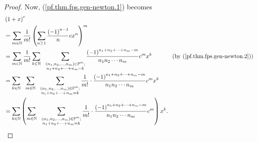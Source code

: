 \begin{proof}
Now, (\ref{pf.thm.fps.gen-newton.1}) becomes%
\begin{align}
&  \left(  1+x\right)  ^{c}\nonumber\\
&  =\sum_{m\in\mathbb{N}}\dfrac{1}{m!}\left(  \sum_{n\geq1}\dfrac{\left(
-1\right)  ^{n-1}}{n}cx^{n}\right)  ^{m}\nonumber\\
&  =\sum_{m\in\mathbb{N}}\dfrac{1}{m!}\sum_{k\in\mathbb{N}}\ \ \sum
_{\substack{\left(  n_{1},n_{2},\ldots,n_{m}\right)  \in\mathbb{P}^{m}%
;\\n_{1}+n_{2}+\cdots+n_{m}=k}}\dfrac{\left(  -1\right)  ^{n_{1}+n_{2}%
+\cdots+n_{m}-m}}{n_{1}n_{2}\cdots n_{m}}c^{m}x^{k}\ \ \ \ \ \ \ \ \ \ \left(
\text{by (\ref{pf.thm.fps.gen-newton.2})}\right) \nonumber\\
&  =\sum_{k\in\mathbb{N}}\ \ \sum_{m\in\mathbb{N}}\ \ \sum_{\substack{\left(
n_{1},n_{2},\ldots,n_{m}\right)  \in\mathbb{P}^{m};\\n_{1}+n_{2}+\cdots
+n_{m}=k}}\dfrac{1}{m!}\cdot\dfrac{\left(  -1\right)  ^{n_{1}+n_{2}%
+\cdots+n_{m}-m}}{n_{1}n_{2}\cdots n_{m}}c^{m}x^{k}\nonumber\\
&  =\sum_{k\in\mathbb{N}}\left(  \sum_{m\in\mathbb{N}}\ \ \sum
_{\substack{\left(  n_{1},n_{2},\ldots,n_{m}\right)  \in\mathbb{P}^{m}%
;\\n_{1}+n_{2}+\cdots+n_{m}=k}}\dfrac{1}{m!}\cdot\dfrac{\left(  -1\right)
^{n_{1}+n_{2}+\cdots+n_{m}-m}}{n_{1}n_{2}\cdots n_{m}}c^{m}\right)  x^{k}.
\label{pf.thm.fps.gen-newton.3}%
\end{align}



\end{proof}
